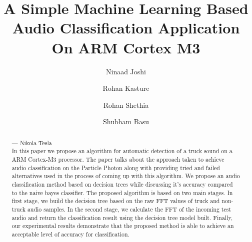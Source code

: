 \documentclass[sigconf, authorversion=false,  screen=true]{acmart}
\begin{document}
\title{A Simple Machine Learning Based Audio Classification Application On ARM Cortex M3}

\author{Ninaad Joshi}

\author{Rohan Kasture}

\author{Rohan Shethia}

\author{Shubham Basu}

\renewcommand{\shortauthors}{N. Joshi, R. Kasture, R. Shethia, S. Basu}


\begin{abstract}
	 --- Nikola Tesla\\
	In this paper we propose an algorithm for automatic detection of a truck sound on a ARM Cortex-M3 processor. The paper talks about the approach taken to achieve audio classification on the Particle Photon along with providing tried and failed alternatives used in the process of coming up with this algorithm. We propose an audio classification method based on decision trees while discussing it’s accuracy compared to the naive bayes classifier. The proposed algorithm is based on two main stages. In first stage, we build the decision tree based on the raw FFT values of truck and non-truck audio samples. In the second stage, we calculate the FFT of the incoming test audio and return the classification result using the decision tree model built. Finally, our experimental results demonstrate that the proposed method is able to achieve an acceptable level of accuracy for classification.
\end{abstract}
\end{document}
